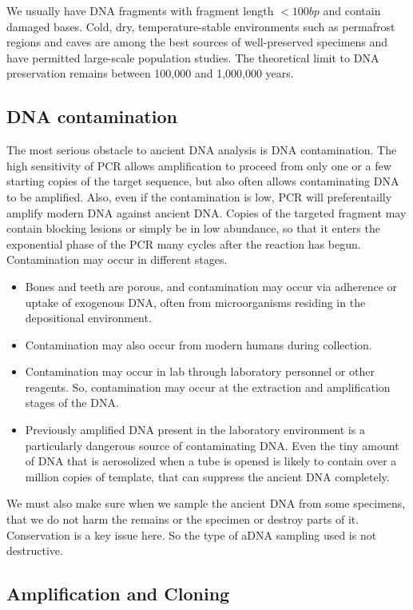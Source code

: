 \documentclass[]{article}
\begin{document}
We usually have DNA fragments with fragment length \(<100 bp\) and
contain damaged bases. Cold, dry, temperature-stable environments such
as permafrost regions and caves are among the best sources of
well-preserved specimens and have permitted large-scale population
studies. The theoretical limit to DNA preservation remains between
100,000 and 1,000,000 years.

\subsection{DNA contamination}\label{dna-contamination}

The most serious obstacle to ancient DNA analysis is DNA contamination.
The high sensitivity of PCR allows amplification to proceed from only
one or a few starting copies of the target sequence, but also often
allows contaminating DNA to be amplified. Also, even if the
contamination is low, PCR will preferentailly amplify modern DNA against
ancient DNA. Copies of the targeted fragment may contain blocking
lesions or simply be in low abundance, so that it enters the exponential
phase of the PCR many cycles after the reaction has begun. Contamination
may occur in different stages.

\begin{itemize}
\item  Bones and teeth are porous, and contamination may occur via adherence or uptake of exogenous DNA, often from microorganisms residing in the depositional environment. 
\item Contamination may also occur from modern humans during collection.
\item Contamination may occur in lab through laboratory personnel or other reagents. So, contamination may occur at the extraction and amplification stages of the DNA.
\item  Previously amplified DNA present in the laboratory environment is a particularly dangerous source of contaminating DNA. Even the tiny amount of DNA that is aerosolized when a tube is opened is likely to contain over a million copies of template, that can suppress the ancient DNA completely.
\end{itemize}

We must also make sure when we sample the ancient DNA from some
specimens, that we do not harm the remains or the specimen or destroy
parts of it. Conservation is a key issue here. So the type of aDNA
sampling used is not destructive.

\subsection{Amplification and Cloning}\label{amplification-and-cloning}
\end{document}
